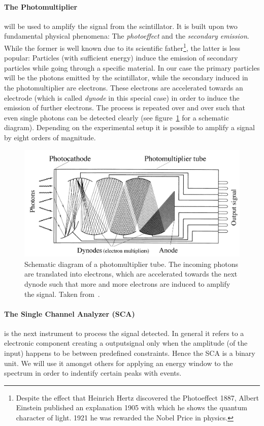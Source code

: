 \paragraph{The Photomultiplier}
will be used to amplify the signal from the scintillator. It is built upon
two fundamental physical phenomena: The \textit{photoeffect} and the \textit{secondary emission}. While the former
is well known due to its scientific father\footnote{Despite the effect that Heinrich Hertz discovered the 
Photoeffect 1887, Albert Einstein published an explanation 1905 with which he shows the quantum character
of light. 1921 he was rewarded the Nobel Price in physics.}, the latter is less popular: Particles (with
sufficient energy) induce the emission of secondary particles while going through a specific material. In
our case the primary particles will be the photons emitted by the scintillator, while the secondary induced
in the photomultiplier are electrons. These electrons are accelerated towards an electrode (which is called
\textit{dynode} in this special case) in order to induce the emission of further electrons. 
The process is repeated over and over such that even single photons can be detected clearly
(see figure~\ref{fig:photomultiplier} for a schematic diagram).
Depending on the experimental setup it is possible to amplify a signal by eight orders of magnitude. 
\begin{figure}[htpb]
    \centering
    \includegraphics[width=0.8\linewidth]{figures/photomultiplier}
    \caption{
        Schematic diagram of a photomultiplier tube. The incoming photons are translated into electrons, 
        which are accelerated towards the
        next dynode such that more and more electrons are induced to amplify the signal.
        Taken from~\cite{bettini2008introduction}. 
        }
    \label{fig:photomultiplier}
\end{figure}
\paragraph{The Single Channel Analyzer (SCA)} is the next instrument to process the signal detected. In general
it refers to a electronic component creating a outputsignal only when the amplitude (of the input) happens to be
between predefined constraints. Hence the SCA is a binary unit. We will use it amongst others for
applying an energy window to the spectrum in order to indentify certain peaks with events. 
